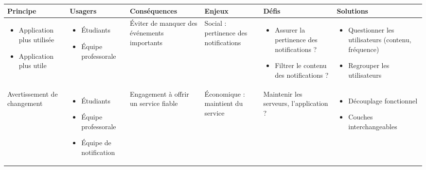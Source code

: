\begin{tabular}{P{0.15\textwidth}P{0.15\textwidth}P{0.15\textwidth}P{0.15\textwidth}P{0.15\textwidth}P{0.15\textwidth}}
	\hline
	\bf Principe & \bf Usagers & \bf Conséquences & \bf Enjeux & \bf Défis & \bf Solutions \\
	\hline
	\hline
	\begin{itemize}
		\item Application plus utilisée
		\item Application plus utile
	\end{itemize}
	& \begin{itemize}
		\item Étudiants
		\item Équipe professorale
	\end{itemize}
	& Éviter de manquer des événements importants
	& Social : pertinence des notifications
	& \begin{itemize}
		\item Assurer la pertinence des notifications ?
		\item Filtrer le contenu des notifications ?
	\end{itemize}
	& \begin{itemize}
		\item Questionner les utilisateurs (contenu, fréquence)
		\item Regrouper les utilisateurs
	\end{itemize}
	\\
	Avertissement de changement
	& \begin{itemize}
		\item Étudiants
		\item Équipe professorale
		\item Équipe de notification
	\end{itemize} 
	& Engagement à offrir un service fiable
	& Économique : maintient du service
	& Maintenir les serveurs, l'application ?
	& \begin{itemize}
		\item Découplage fonctionnel
		\item Couches interchangeables 
	\end{itemize}
	\\
	
	\hline
\end{tabular}